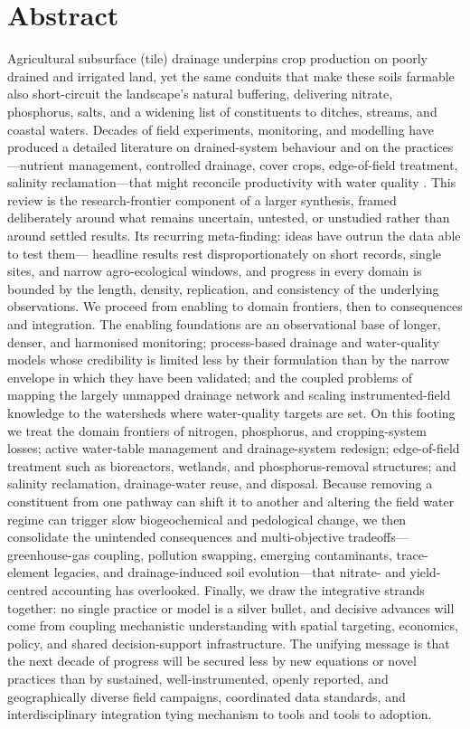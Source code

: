 \documentclass[11pt]{article}
\begin{document}
\section*{Abstract}

Agricultural subsurface (tile) drainage underpins crop production on poorly drained and irrigated land, yet the same conduits that make these soils farmable also short-circuit the landscape's natural buffering, delivering nitrate, phosphorus, salts, and a widening list of constituents to ditches, streams, and coastal waters. Decades of field experiments, monitoring, and modelling have produced a detailed literature on drained-system behaviour and on the practices---nutrient management, controlled drainage, cover crops, edge-of-field treatment, salinity reclamation---that might reconcile productivity with water quality \parencite{Randall2001}. This review is the research-frontier component of a larger synthesis, framed deliberately around what remains uncertain, untested, or unstudied rather than around settled results. Its recurring meta-finding: ideas have outrun the data able to test them--- headline results rest disproportionately on short records, single sites, and narrow agro-ecological windows, and progress in every domain is bounded by the length, density, replication, and consistency of the underlying observations. We proceed from enabling to domain frontiers, then to consequences and integration. The enabling foundations are an observational base of longer, denser, and harmonised monitoring; process-based drainage and water-quality models whose credibility is limited less by their formulation than by the narrow envelope in which they have been validated; and the coupled problems of mapping the largely unmapped drainage network and scaling instrumented-field knowledge to the watersheds where water-quality targets are set. On this footing we treat the domain frontiers of nitrogen, phosphorus, and cropping-system losses; active water-table management and drainage-system redesign; edge-of-field treatment such as bioreactors, wetlands, and phosphorus-removal structures; and salinity reclamation, drainage-water reuse, and disposal. Because removing a constituent from one pathway can shift it to another and altering the field water regime can trigger slow biogeochemical and pedological change, we then consolidate the unintended consequences and multi-objective tradeoffs---greenhouse-gas coupling, pollution swapping, emerging contaminants, trace-element legacies, and drainage-induced soil evolution---that nitrate- and yield-centred accounting has overlooked. Finally, we draw the integrative strands together: no single practice or model is a silver bullet, and decisive advances will come from coupling mechanistic understanding with spatial targeting, economics, policy, and shared decision-support infrastructure. The unifying message is that the next decade of progress will be secured less by new equations or novel practices than by sustained, well-instrumented, openly reported, and geographically diverse field campaigns, coordinated data standards, and interdisciplinary integration tying mechanism to tools and tools to adoption.

\printbibliography
\end{document}
